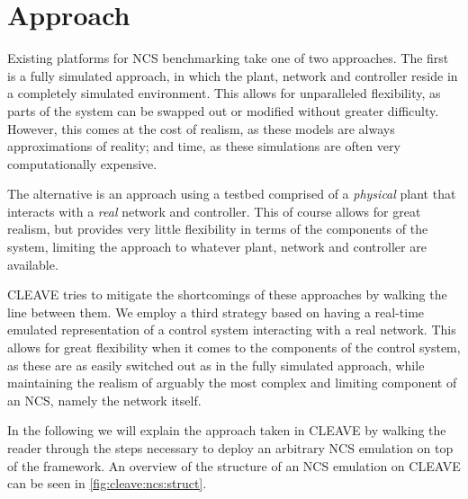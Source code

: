 \pagebreak
\section{Approach}

Existing platforms for NCS benchmarking take one of two approaches.
The first is a fully simulated approach, in which the plant, network and controller reside in a completely simulated environment.
This allows for unparalleled flexibility, as parts of the system can be swapped out or modified without greater difficulty.
However, this comes at the cost of realism, as these models are always approximations of reality; and time, as these simulations are often very computationally expensive.

The alternative is an approach using a testbed comprised of a \emph{physical} plant that interacts with a \emph{real} network and controller.
This of course allows for great realism, but provides very little flexibility in terms of the components of the system, limiting the approach to whatever plant, network and controller are available.

CLEAVE tries to mitigate the shortcomings of these approaches by walking the line between them.
We employ a third strategy based on having a real-time emulated representation of a control system interacting with a real network.
This allows for great flexibility when it comes to the components of the control system, as these are as easily switched out as in the fully simulated approach, while maintaining the realism of arguably the most complex and limiting component of an NCS, namely the network itself.

In the following we will explain the approach taken in CLEAVE by walking the reader through the steps necessary to deploy an arbitrary NCS emulation on top of the framework.
An overview of the structure of an NCS emulation on CLEAVE can be seen in \cref{fig:cleave:ncs:struct}.

